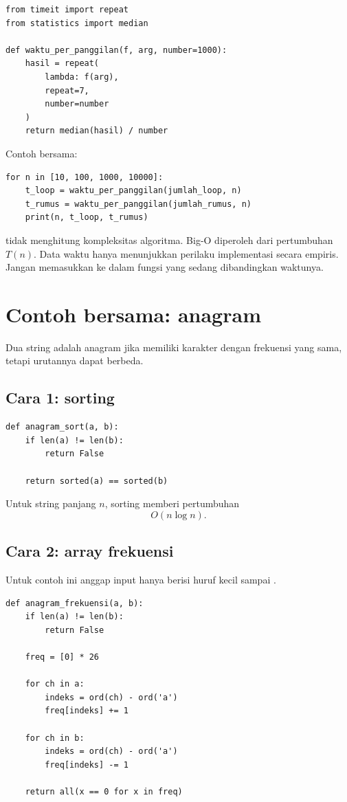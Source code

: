 \documentclass[11pt,a4paper]{report}
\newcommand{\kode}[1]{\texttt{\detokenize{#1}}}
\begin{document}
\begin{lstlisting}
from timeit import repeat
from statistics import median

def waktu_per_panggilan(f, arg, number=1000):
    hasil = repeat(
        lambda: f(arg),
        repeat=7,
        number=number
    )
    return median(hasil) / number
\end{lstlisting}

Contoh bersama:

\begin{lstlisting}
for n in [10, 100, 1000, 10000]:
    t_loop = waktu_per_panggilan(jumlah_loop, n)
    t_rumus = waktu_per_panggilan(jumlah_rumus, n)
    print(n, t_loop, t_rumus)
\end{lstlisting}

\begin{catatanbox}
\kode{timeit} tidak menghitung kompleksitas algoritma. Big-O diperoleh dari pertumbuhan
$T(n)$. Data waktu hanya menunjukkan perilaku implementasi secara empiris.
Jangan memasukkan \kode{print} ke dalam fungsi yang sedang dibandingkan waktunya.
\end{catatanbox}

\section{Contoh bersama: anagram}

Dua string adalah anagram jika memiliki karakter dengan frekuensi yang sama, tetapi urutannya
dapat berbeda.

\subsection{Cara 1: sorting}

\begin{lstlisting}
def anagram_sort(a, b):
    if len(a) != len(b):
        return False

    return sorted(a) == sorted(b)
\end{lstlisting}

Untuk string panjang $n$, sorting memberi pertumbuhan
\[
O(n\log n).
\]

\subsection{Cara 2: array frekuensi}

Untuk contoh ini anggap input hanya berisi huruf kecil \kode{a} sampai \kode{z}.

\begin{lstlisting}
def anagram_frekuensi(a, b):
    if len(a) != len(b):
        return False

    freq = [0] * 26

    for ch in a:
        indeks = ord(ch) - ord('a')
        freq[indeks] += 1

    for ch in b:
        indeks = ord(ch) - ord('a')
        freq[indeks] -= 1

    return all(x == 0 for x in freq)
\end{lstlisting}
\end{document}
